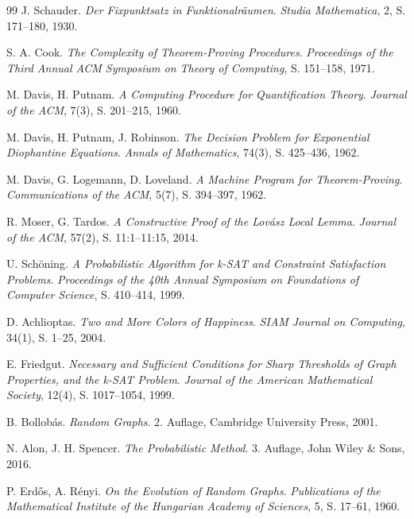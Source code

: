 \documentclass[a4paper,12pt]{article}
\theoremstyle{definition}
\begin{document}
\begin{thebibliography}{99}
 J. Schauder. \textit{Der Fixpunktsatz in Funktionalräumen}. \textit{Studia Mathematica}, 2, S. 171--180, 1930.


 S. A. Cook. \textit{The Complexity of Theorem-Proving Procedures}. \textit{Proceedings of the Third Annual ACM Symposium on Theory of Computing}, S. 151--158, 1971.

 M. Davis, H. Putnam. \textit{A Computing Procedure for Quantification Theory}. \textit{Journal of the ACM}, 7(3), S. 201--215, 1960.

 M. Davis, H. Putnam, J. Robinson. \textit{The Decision Problem for Exponential Diophantine Equations}. \textit{Annals of Mathematics}, 74(3), S. 425--436, 1962.

 M. Davis, G. Logemann, D. Loveland. \textit{A Machine Program for Theorem-Proving}. \textit{Communications of the ACM}, 5(7), S. 394--397, 1962.

 R. Moser, G. Tardos. \textit{A Constructive Proof of the Lovász Local Lemma}. \textit{Journal of the ACM}, 57(2), S. 11:1--11:15, 2014.

 U. Schöning. \textit{A Probabilistic Algorithm for k-SAT and Constraint Satisfaction Problems}. \textit{Proceedings of the 40th Annual Symposium on Foundations of Computer Science}, S. 410--414, 1999.

 D. Achlioptas. \textit{Two and More Colors of Happiness}. \textit{SIAM Journal on Computing}, 34(1), S. 1--25, 2004.

 E. Friedgut. \textit{Necessary and Sufficient Conditions for Sharp Thresholds of Graph Properties, and the k-SAT Problem}. \textit{Journal of the American Mathematical Society}, 12(4), S. 1017--1054, 1999.


 B. Bollobás. \textit{Random Graphs}. 2. Auflage, Cambridge University Press, 2001.

 N. Alon, J. H. Spencer. \textit{The Probabilistic Method}. 3. Auflage, John Wiley \& Sons, 2016.

 P. Erdős, A. Rényi. \textit{On the Evolution of Random Graphs}. \textit{Publications of the Mathematical Institute of the Hungarian Academy of Sciences}, 5, S. 17--61, 1960.


\end{thebibliography}
\end{document}
